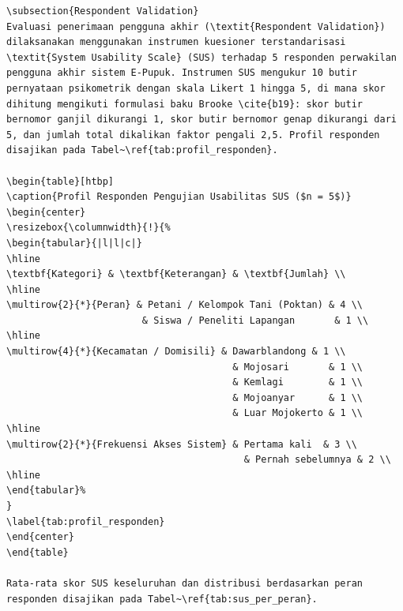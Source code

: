 \documentclass[conference]{IEEEtran}
\begin{document}
\begin{lstlisting}
\subsection{Respondent Validation}
Evaluasi penerimaan pengguna akhir (\textit{Respondent Validation}) dilaksanakan menggunakan instrumen kuesioner terstandarisasi \textit{System Usability Scale} (SUS) terhadap 5 responden perwakilan pengguna akhir sistem E-Pupuk. Instrumen SUS mengukur 10 butir pernyataan psikometrik dengan skala Likert 1 hingga 5, di mana skor dihitung mengikuti formulasi baku Brooke \cite{b19}: skor butir bernomor ganjil dikurangi 1, skor butir bernomor genap dikurangi dari 5, dan jumlah total dikalikan faktor pengali 2,5. Profil responden disajikan pada Tabel~\ref{tab:profil_responden}.

\begin{table}[htbp]
\caption{Profil Responden Pengujian Usabilitas SUS ($n = 5$)}
\begin{center}
\resizebox{\columnwidth}{!}{%
\begin{tabular}{|l|l|c|}
\hline
\textbf{Kategori} & \textbf{Keterangan} & \textbf{Jumlah} \\
\hline
\multirow{2}{*}{Peran} & Petani / Kelompok Tani (Poktan) & 4 \\
                        & Siswa / Peneliti Lapangan       & 1 \\
\hline
\multirow{4}{*}{Kecamatan / Domisili} & Dawarblandong & 1 \\
                                        & Mojosari       & 1 \\
                                        & Kemlagi        & 1 \\
                                        & Mojoanyar      & 1 \\
                                        & Luar Mojokerto & 1 \\
\hline
\multirow{2}{*}{Frekuensi Akses Sistem} & Pertama kali  & 3 \\
                                          & Pernah sebelumnya & 2 \\
\hline
\end{tabular}%
}
\label{tab:profil_responden}
\end{center}
\end{table}

Rata-rata skor SUS keseluruhan dan distribusi berdasarkan peran responden disajikan pada Tabel~\ref{tab:sus_per_peran}.


\end{lstlisting}
\end{document}
